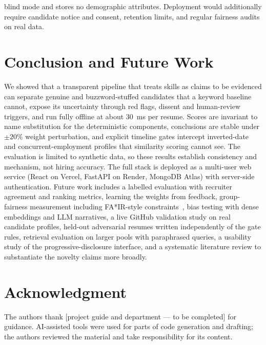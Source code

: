 \documentclass[conference]{IEEEtran}
\begin{document}
blind mode and stores no demographic attributes. Deployment would additionally require candidate notice and consent, retention limits, and regular fairness audits on real data.

\section{Conclusion and Future Work}
We showed that a transparent pipeline that treats skills as claims to be evidenced can separate genuine and buzzword-stuffed candidates that a keyword baseline cannot, expose its uncertainty through red flags, dissent and human-review triggers, and run fully offline at about 30~ms per resume. Scores are invariant to name substitution for the deterministic components, conclusions are stable under $\pm20\%$ weight perturbation, and explicit timeline gates intercept inverted-date and concurrent-employment profiles that similarity scoring cannot see. The evaluation is limited to synthetic data, so these results establish consistency and mechanism, not hiring accuracy. The full stack is deployed as a multi-user web service (React on Vercel, FastAPI on Render, MongoDB Atlas) with server-side authentication. Future work includes a labelled evaluation with recruiter agreement and ranking metrics, learning the weights from feedback, group-fairness measurement including FA*IR-style constraints~\cite{fair}, bias testing with dense embeddings and LLM narratives, a live GitHub validation study on real candidate profiles, held-out adversarial resumes written independently of the gate rules, retrieval evaluation on larger pools with paraphrased queries, a usability study of the progressive-disclosure interface, and a systematic literature review to substantiate the novelty claims more broadly.

\section*{Acknowledgment}
The authors thank [project guide and department --- to be completed] for guidance. AI-assisted tools were used for parts of code generation and drafting; the authors reviewed the material and take responsibility for its content.
\end{document}
